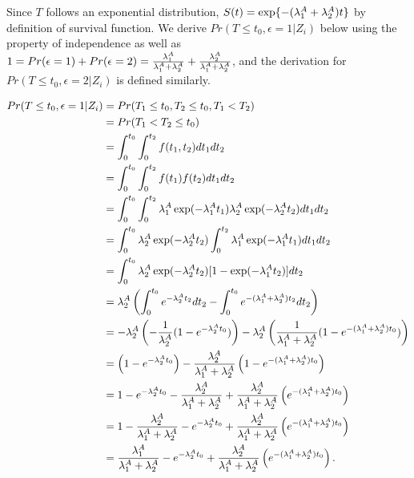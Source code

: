 Since $T$ follows an exponential distribution, $S(t) = \exp\{-(\lambda^A_1+\lambda^A_2)t\}$ by definition of survival function. %
We derive $Pr(T \leq t_0, \epsilon = 1|Z_i)$ below using the property of independence as well as $1 = Pr(\epsilon = 1) + Pr(\epsilon = 2) =  \frac{\lambda^A_1}{\lambda^A_1 + \lambda^A_2} +  \frac{\lambda^A_2}{\lambda^A_1 + \lambda^A_2}$, and the derivation for $Pr(T \leq t_0, \epsilon = 2|Z_i)$ is defined similarly.

\begin{align*}
\label{eq_sim_subdistr_simpleexp}
Pr(T \leq t_0, \epsilon = 1|Z_i) 
&= Pr(T_1 \leq t_0, T_2 \leq t_0, T_1 < T_2)\\
&= Pr(T_1 < T_2 \leq t_0) \\
&= \int^{t_0}_0 \int^{t_2}_0 f(t_1, t_2) dt_1 dt_2\\
&= \int^{t_0}_0 \int^{t_2}_0 f(t_1) f(t_2) dt_1 dt_2\\
&= \int^{t_0}_0 \int^{t_2}_0 \lambda^A_1 \exp(-\lambda^A_1 t_1) \lambda^A_2 \exp(-\lambda^A_2 t_2) dt_1 dt_2\\
&= \int^{t_0}_0 \lambda^A_2 \exp(-\lambda^A_2 t_2) \int^{t_2}_0 \lambda^A_1 \exp(-\lambda^A_1 t_1) dt_1 dt_2\\
&= \int^{t_0}_0 \lambda^A_2 \exp(-\lambda^A_2 t_2) [1-\exp(-\lambda^A_1 t_2)]dt_2\\
&= \lambda^A_2 \left( \int^{t_0}_0 e^{-\lambda^A_2 t_2}dt_2 - \int^{t_0}_0 e^{-(\lambda^A_1 +\lambda^A_2) t_2}dt_2 \right)\\
&= -\lambda^A_2 \left(-\frac{1}{\lambda^A_2} (1- e^{-\lambda^A_2 t_0}) \right) - \lambda^A_2 \left(\frac{1}{\lambda^A_1 + \lambda^A_2} (1 - e^{-(\lambda^A_1 +\lambda^A_2) t_0}) \right)\\
&= \left(1- e^{-\lambda^A_2 t_0} \right) - \frac{\lambda^A_2}{\lambda^A_1 + \lambda^A_2}\left(  1 - e^{-(\lambda^A_1 +\lambda^A_2) t_0} \right)\\
&= 1- e^{-\lambda^A_2 t_0} - \frac{\lambda^A_2}{\lambda^A_1 + \lambda^A_2} + \frac{\lambda^A_2}{\lambda^A_1 + \lambda^A_2}\left(e^{-(\lambda^A_1 +\lambda^A_2) t_0} \right)\\
&= 1 - \frac{\lambda^A_2}{\lambda^A_1 + \lambda^A_2} - e^{-\lambda^A_2 t_0} + \frac{\lambda^A_2}{\lambda^A_1 + \lambda^A_2}\left(e^{-(\lambda^A_1 +\lambda^A_2) t_0} \right)\\
&= \frac{\lambda^A_1}{\lambda^A_1 + \lambda^A_2} - e^{-\lambda^A_2 t_0} + \frac{\lambda^A_2}{\lambda^A_1 + \lambda^A_2}\left(e^{-(\lambda^A_1 +\lambda^A_2) t_0} \right).
\end{align*}
